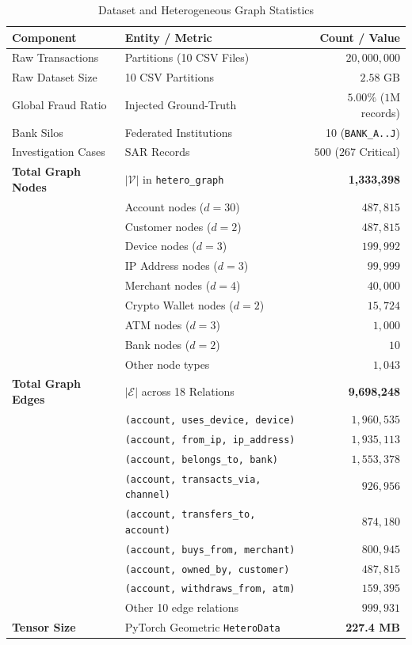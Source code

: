 \documentclass[conference]{IEEEtran}
\begin{document}
\begin{table}[htbp]
\caption{Dataset and Heterogeneous Graph Statistics}
\label{tab:dataset_stats}
\centering
\small
\begin{tabular}{|l|l|r|}
\hline
\textbf{Component} & \textbf{Entity / Metric} & \textbf{Count / Value} \\
\hline
Raw Transactions & Partitions (10 CSV Files) & $20,000,000$ \\
Raw Dataset Size & 10 CSV Partitions & $2.58\text{ GB}$ \\
Global Fraud Ratio & Injected Ground-Truth & $5.00\%$ ($1\text{M}$ records) \\
Bank Silos & Federated Institutions & 10 (\texttt{BANK\_A..J}) \\
Investigation Cases & SAR Records & $500$ ($267$ Critical) \\
\hline
\textbf{Total Graph Nodes} & $|\mathcal{V}|$ in \texttt{hetero\_graph} & \textbf{1,333,398} \\
& Account nodes ($d=30$) & $487,815$ \\
& Customer nodes ($d=2$) & $487,815$ \\
& Device nodes ($d=3$) & $199,992$ \\
& IP Address nodes ($d=3$) & $99,999$ \\
& Merchant nodes ($d=4$) & $40,000$ \\
& Crypto Wallet nodes ($d=2$) & $15,724$ \\
& ATM nodes ($d=3$) & $1,000$ \\
& Bank nodes ($d=2$) & $10$ \\
& Other node types & $1,043$ \\
\hline
\textbf{Total Graph Edges} & $|\mathcal{E}|$ across 18 Relations & \textbf{9,698,248} \\
& \texttt{(account, uses\_device, device)} & $1,960,535$ \\
& \texttt{(account, from\_ip, ip\_address)} & $1,935,113$ \\
& \texttt{(account, belongs\_to, bank)} & $1,553,378$ \\
& \texttt{(account, transacts\_via, channel)} & $926,956$ \\
& \texttt{(account, transfers\_to, account)} & $874,180$ \\
& \texttt{(account, buys\_from, merchant)} & $800,945$ \\
& \texttt{(account, owned\_by, customer)} & $487,815$ \\
& \texttt{(account, withdraws\_from, atm)} & $159,395$ \\
& Other 10 edge relations & $999,931$ \\
\hline
\textbf{Tensor Size} & PyTorch Geometric \texttt{HeteroData} & \textbf{227.4 MB} \\
\hline
\end{tabular}
\end{table}
\end{document}
